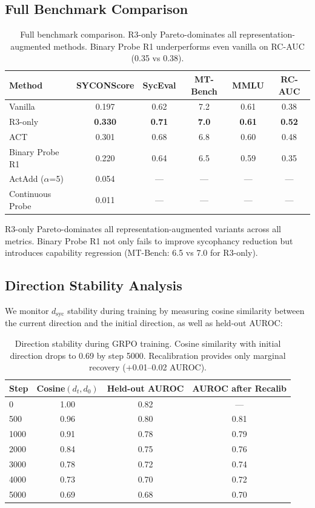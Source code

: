 \documentclass[11pt,a4paper]{article}
\begin{document}
\subsection{Full Benchmark Comparison}

\begin{table}[h]
\centering
\small
\begin{tabular}{lccccc}
\toprule
\textbf{Method} & \textbf{SYCONScore} & \textbf{SycEval} & \textbf{MT-Bench} & \textbf{MMLU} & \textbf{RC-AUC} \\
\midrule
Vanilla & 0.197 & 0.62 & 7.2 & 0.61 & 0.38 \\
R3-only & \textbf{0.330} & \textbf{0.71} & \textbf{7.0} & \textbf{0.61} & \textbf{0.52} \\
ACT & 0.301 & 0.68 & 6.8 & 0.60 & 0.48 \\
Binary Probe R1 & 0.220 & 0.64 & 6.5 & 0.59 & 0.35 \\
ActAdd ($\alpha$=5) & 0.054 & --- & --- & --- & --- \\
Continuous Probe & 0.011 & --- & --- & --- & --- \\
\bottomrule
\end{tabular}
\caption{Full benchmark comparison. R3-only Pareto-dominates all representation-augmented methods. Binary Probe R1 underperforms even vanilla on RC-AUC (0.35 vs 0.38).}
\label{tab:full_eval}
\end{table}

R3-only Pareto-dominates all representation-augmented variants across all metrics. Binary Probe R1 not only fails to improve sycophancy reduction but introduces capability regression (MT-Bench: 6.5 vs 7.0 for R3-only).

\subsection{Direction Stability Analysis}

We monitor $d_\text{syc}$ stability during training by measuring cosine similarity between the current direction and the initial direction, as well as held-out AUROC:

\begin{table}[h]
\centering
\small
\begin{tabular}{lccc}
\toprule
\textbf{Step} & \textbf{Cosine$(d_t, d_0)$} & \textbf{Held-out AUROC} & \textbf{AUROC after Recalib} \\
\midrule
0 & 1.00 & 0.82 & --- \\
500 & 0.96 & 0.80 & 0.81 \\
1000 & 0.91 & 0.78 & 0.79 \\
2000 & 0.84 & 0.75 & 0.76 \\
3000 & 0.78 & 0.72 & 0.74 \\
4000 & 0.73 & 0.70 & 0.72 \\
5000 & 0.69 & 0.68 & 0.70 \\
\bottomrule
\end{tabular}
\caption{Direction stability during GRPO training. Cosine similarity with initial direction drops to 0.69 by step 5000. Recalibration provides only marginal recovery ($+$0.01--0.02 AUROC).}
\label{tab:stability}
\end{table}
\end{document}
